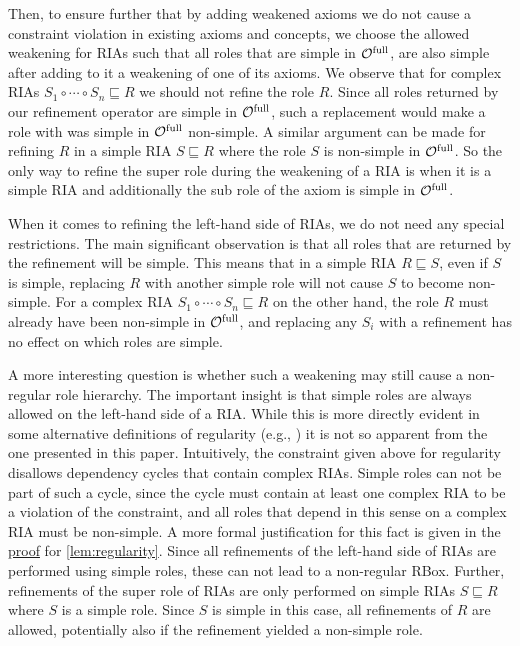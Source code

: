\documentclass[
]{ceurart}
\begin{document}
Then, to ensure further that by adding weakened axioms we do not cause a constraint violation in existing axioms and concepts, we choose the allowed weakening for RIAs such that all roles that are simple in ${\mathcal{O}^\textnormal{full}}$, are also simple after adding to it a weakening of one of its axioms. We observe that for complex RIAs $S_1 \circ \cdots \circ S_n \sqsubseteq R$ we should not refine the role $R$. Since all roles returned by our refinement operator are simple in ${\mathcal{O}^\textnormal{full}}$, such a replacement would make a role with was simple in ${\mathcal{O}^\textnormal{full}}$ non-simple. A similar argument can be made for refining $R$ in a simple RIA $S \sqsubseteq R$ where the role $S$ is non-simple in ${\mathcal{O}^\textnormal{full}}$. So the only way to refine the super role during the weakening of a RIA is when it is a simple RIA and additionally the sub role of the axiom is simple in ${\mathcal{O}^\textnormal{full}}$.

When it comes to refining the left-hand side of RIAs, we do not need any special restrictions. The main significant observation is that all roles that are returned by the refinement will be simple. This means that in a simple RIA $R \sqsubseteq S$, even if $S$ is simple, replacing $R$ with another simple role will not cause $S$ to become non-simple. For a complex RIA $S_1 \circ \cdots \circ S_n \sqsubseteq R$ on the other hand, the role $R$ must already have been non-simple in ${\mathcal{O}^\textnormal{full}}$, and replacing any $S_i$ with a refinement has no effect on which roles are simple.

A more interesting question is whether such a weakening may still cause a non-regular role hierarchy. The important insight is that simple roles are always allowed on the left-hand side of a RIA. While this is more directly evident in some alternative definitions of regularity (e.g., \cite{rudolph2011foundations}) it is not so apparent from the one presented in this paper. Intuitively, the constraint given above for regularity disallows dependency cycles that contain complex RIAs. Simple roles can not be part of such a cycle, since the cycle must contain at least one complex RIA to be a violation of the constraint, and all roles that depend in this sense on a complex RIA must be non-simple. A more formal justification for this fact is given in the \hyperref[proof:regularity]{proof} for \cref{lem:regularity}.
Since all refinements of the left-hand side of RIAs are performed using simple roles, these can not lead to a non-regular RBox. Further, refinements of the super role of RIAs are only performed on simple RIAs $S \sqsubseteq R$ where $S$ is a simple role. Since $S$ is simple in this case, all refinements of $R$ are allowed, potentially also if the refinement yielded a non-simple role.
\end{document}

